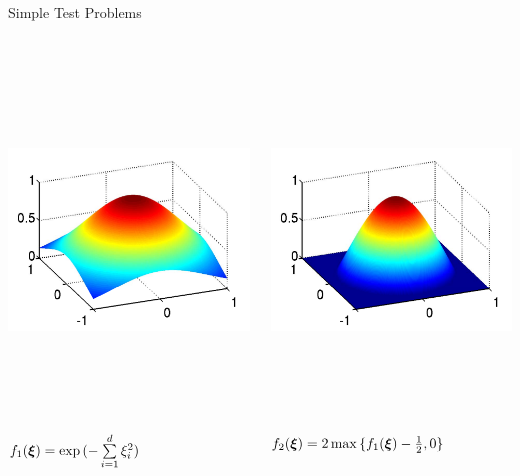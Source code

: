 \documentclass[final]{beamer}
\newcommand {\bxi} {\mbox{\boldmath $\xi$}}%
\begin{document}
\begin{frame}{}
{\begin{columns}[t]
\begin{column}{.30\linewidth}
\begin{block}{\centering Simple Test Problems}
\vspace{-1em}
\begin{columns}[T]
\begin{column}{18cm}{}
\centering\includegraphics[height=10cm, width = 14cm]{figures/gaussian}\\
\centering\scriptsize{$f_1(\bxi) = \exp{(-\sum\limits_{i=1}^d \xi_i^2)}$}
\end{column}
\begin{column}{18cm}{}
\centering\includegraphics[height=10cm, width = 14cm]{figures/maxgaussian}\\
\centering\scriptsize{$f_2(\bxi) = 2\max{\{f_1(\bxi)-\frac{1}{2},0\}}$}
\end{column}
\end{columns}


\end{block}
\end{column}
\end{columns}}
\end{frame}
\end{document}
